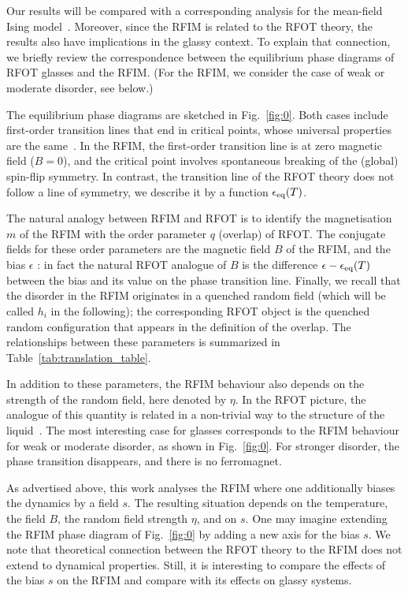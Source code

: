 \documentclass{iopart}
\begin{document}
Our results will be compared with 
a corresponding analysis for the mean-field Ising model~\cite{GuiothJack2020}.  
Moreover, since the RFIM is related to the RFOT theory, the results also have implications in the glassy context.
To explain that connection, we briefly %
review the correspondence between the equilibrium phase diagrams of RFOT glasses and the RFIM.
 (For the RFIM, we consider the case of weak or moderate disorder, see below.)
 
The equilibrium phase diagrams are sketched in
Fig.~\ref{fig:0}. 
%
Both cases include first-order transition lines that end in critical points, whose universal properties are the same~\cite{biroli2014random,biroli2018random1,biroli2018random2,franz2013glassy,franz2013universality}.
%
In the RFIM, the first-order transition line is at zero magnetic field ($B=0$), and the critical point involves spontaneous breaking of the (global) spin-flip symmetry.   
%
In contrast, the transition line of the RFOT theory does not follow a line of symmetry, we describe it by a function $\epsilon_{\rm eq}(T)$.

The natural analogy between RFIM and RFOT is to identify the magnetisation $m$ of the RFIM with the order parameter $q$ (overlap) of RFOT. The conjugate fields for these order parameters are the magnetic field $B$ of the RFIM, and the bias $\epsilon$ : in fact the natural RFOT analogue of $B$ is the difference $\epsilon-\epsilon_{\rm eq}(T)$ between the bias and its value on the phase transition line.  
%
Finally, we recall that the disorder in the RFIM originates in a quenched random field (which will be called $h_i$ in the following); the corresponding RFOT object is the quenched random configuration that appears in the definition of the overlap.   The relationships between these parameters is summarized in Table~\ref{tab:translation_table}.

In addition to these parameters, the RFIM behaviour also depends on the strength of the random field, here denoted by $\eta$.
In the RFOT picture, the analogue of this quantity is related in a non-trivial way to the structure of the liquid~\cite{biroli2014random}.  The most interesting case for glasses corresponds to the RFIM behaviour for weak or moderate disorder, as shown in Fig.~\ref{fig:0}.  For stronger disorder, the phase transition disappears, and there is no ferromagnet.

As advertised above, this work analyses the RFIM where one additionally biases the dynamics by a field $s$.  
The resulting situation depends on the temperature, the field $B$, the random field strength $\eta$, and on $s$.   
One may imagine extending the RFIM phase diagram of Fig.~\ref{fig:0} by adding a new axis for the bias $s$.  
We note that theoretical connection between the RFOT theory to the RFIM does not extend to dynamical properties.  Still, it is interesting to compare the effects of the bias $s$ on the RFIM and compare with its effects on glassy systems. 
\end{document}

